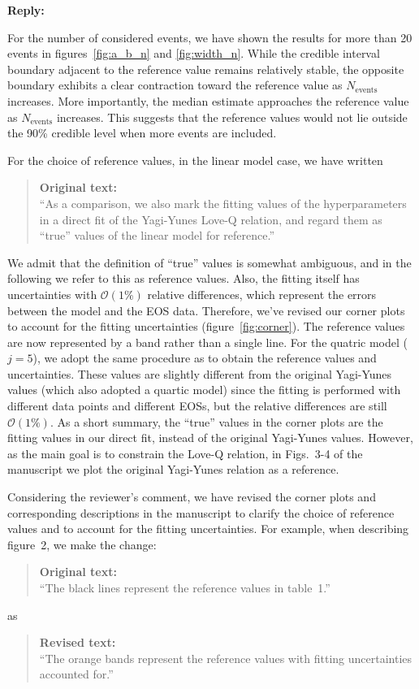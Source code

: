 \documentclass[11pt]{article}
\newenvironment{authorresponse}{
    \noindent \textbf{Reply:} \normalfont
}{
    \par\vspace{1.5em}
}
\newenvironment{originaltext}{
    \begin{quote}
    \color{oldcolor} \small \textbf{Original text:} \\
}{
    \end{quote}
}
\newenvironment{revisedtext}{
    \begin{quote}
    \color{revcolor} \small \textbf{Revised text:} \\
}{
    \end{quote}
}
\begin{document}
\begin{authorresponse}

    For the number of considered events, we have shown the results for more than 20 events in figures~\ref{fig:a_b_n}
    and \ref{fig:width_n}. While the credible interval boundary adjacent to the
    reference value remains relatively stable, the opposite boundary exhibits a
    clear contraction toward the reference value as $N_{\text{events}}$
    increases. More importantly, the median estimate approaches the reference value as $N_{\text{events}}$ increases. This suggests that the reference values would not lie outside the 90\% credible level when more events are included.
     
    For the choice of reference values, in the linear model case, we have written
    \begin{originaltext}
        ``As a comparison, we also mark the fitting values of the
        hyperparameters in a direct fit of the Yagi-Yunes Love-Q relation, and regard
        them as ``true'' values of the linear model for reference.''
    \end{originaltext}
    We admit that the definition of ``true'' values is somewhat ambiguous, and in
    the following we refer to this as reference values. Also, the fitting
    itself has uncertainties with $\mathcal{O} (1\%)$ relative differences, which
    represent the errors between the model and the EOS data. Therefore,
    we've revised our corner plots to account for the fitting uncertainties
    (figure~\ref{fig:corner}). The reference values are now represented by a band
    rather than a single line. For the quatric model ($j=5$), we adopt the same
    procedure as to obtain the reference values and uncertainties. These values are
    slightly different from the original Yagi-Yunes values (which also adopted a
    quartic model) since the fitting is performed with different data points and
    different EOSs, but the relative differences are still $\mathcal{O}
    (1\%)$. 
    As a short summary, the ``true'' values in the corner plots are the fitting
    values in our direct fit, instead of the original Yagi-Yunes values. However,
    as the main goal is to constrain the Love-Q relation, in Figs.~3-4 of the
    manuscript we plot the original Yagi-Yunes relation as a reference. 

    Considering the reviewer's comment, we have revised the corner plots and
    corresponding descriptions in the manuscript to clarify the choice of reference
    values and to account for the fitting uncertainties. For example, when
    describing figure~2, we make the change:
    \begin{originaltext}
        ``The black lines represent the reference values in table~1.''
    \end{originaltext}
    as
    \begin{revisedtext}
        ``The orange bands represent the reference values with fitting uncertainties accounted for.''
    \end{revisedtext}
\end{authorresponse}
\end{document}
